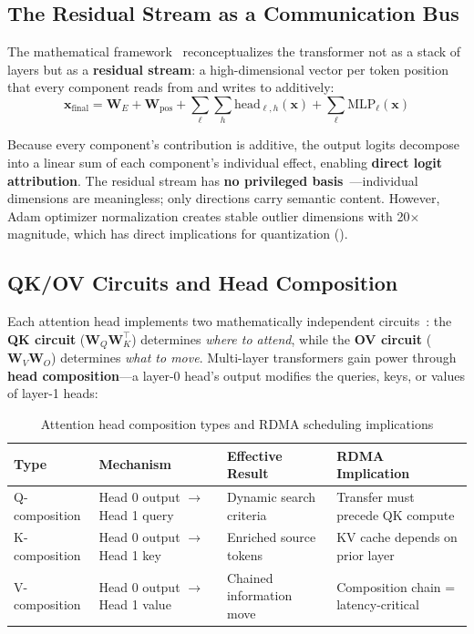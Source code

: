 \documentclass[11pt,letterpaper]{article}
\theoremstyle{definition}
\begin{document}
\subsection{The Residual Stream as a Communication Bus}

The mathematical framework~\cite{elhage2021framework} reconceptualizes the transformer not as a stack of layers but as a \textbf{residual stream}: a high-dimensional vector per token position that every component reads from and writes to additively:
\begin{equation}
    \mathbf{x}_{\text{final}} = \mathbf{W}_E + \mathbf{W}_{\text{pos}} + \sum_{\ell} \sum_h \text{head}_{\ell,h}(\mathbf{x}) + \sum_{\ell} \text{MLP}_\ell(\mathbf{x})
\end{equation}

Because every component's contribution is additive, the output logits decompose into a linear sum of each component's individual effect, enabling \textbf{direct logit attribution}. The residual stream has \textbf{no privileged basis}~\cite{anthropic2023privileged}---individual dimensions are meaningless; only directions carry semantic content. However, Adam optimizer normalization creates stable outlier dimensions with 20$\times$ magnitude, which has direct implications for quantization ().

\subsection{QK/OV Circuits and Head Composition}

Each attention head implements two mathematically independent circuits~\cite{elhage2021framework}: the \textbf{QK circuit} ($\mathbf{W}_Q \mathbf{W}_K^\top$) determines \emph{where to attend}, while the \textbf{OV circuit} ($\mathbf{W}_V \mathbf{W}_O$) determines \emph{what to move}. Multi-layer transformers gain power through \textbf{head composition}---a layer-0 head's output modifies the queries, keys, or values of layer-1 heads:

\begin{table}[htbp]
\centering
\caption{Attention head composition types and RDMA scheduling implications}
\label{tab:composition}
\begin{tabular}{@{}llll@{}}
\toprule
\textbf{Type} & \textbf{Mechanism} & \textbf{Effective Result} & \textbf{RDMA Implication} \\
\midrule
Q-composition & Head 0 output $\to$ Head 1 query & Dynamic search criteria & Transfer must precede QK compute \\
K-composition & Head 0 output $\to$ Head 1 key & Enriched source tokens & KV cache depends on prior layer \\
V-composition & Head 0 output $\to$ Head 1 value & Chained information move & Composition chain = latency-critical \\
\bottomrule
\end{tabular}
\end{table}
\end{document}
